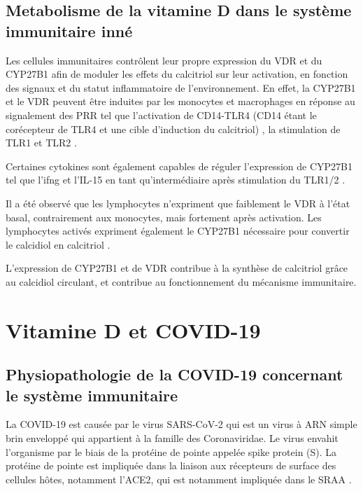 \documentclass[
  a4paper,
  DIV=11,
  numbers=noendperiod,
  listof=totoc]{scrreprt}
\begin{document}
\section{Metabolisme de la vitamine D dans le système immunitaire
inné}\label{metabolisme-de-la-vitamine-d-dans-le-systuxe8me-immunitaire-innuxe9}

Les cellules immunitaires contrôlent leur propre expression du \ac{VDR}
et du \ac{CYP27B1} afin de moduler les effets du calcitriol sur leur
activation, en fonction des signaux et du statut inflammatoire de
l'environnement. En effet, la \ac{CYP27B1} et le \ac{VDR} peuvent être
induites par les monocytes et macrophages en réponse au signalement des
\ac{PRR} tel que l'activation de CD14-TLR4 (CD14 étant le corécepteur de
TLR4 et une cible d'induction du calcitriol) \autocite{Stoffels.2009},
la stimulation de TLR1 et TLR2 \autocite{Liu.2006}.

Certaines cytokines sont également capables de réguler l'expression de
\ac{CYP27B1} tel que l'\ac{ifng} \autocite{Stoffels.2009} et l'IL-15 en
tant qu'intermédiaire après stimulation du TLR1/2
\autocite{Krutzik.2008}.

Il a été observé que les lymphocytes n'expriment que faiblement le
\ac{VDR} à l'état basal, contrairement aux monocytes, mais fortement
après activation. Les lymphocytes activés expriment également le
\ac{CYP27B1} nécessaire pour convertir le calcidiol en calcitriol
\autocite{Bishop.2021,Charoenngam.2020}.

L'expression de \ac{CYP27B1} et de \ac{VDR} contribue à la synthèse de
calcitriol grâce au calcidiol circulant, et contribue au fonctionnement
du mécanisme immunitaire.

\newpage{}

\chapter{Vitamine D et COVID-19}\label{vitamine-d-et-covid-19}

\section{Physiopathologie de la COVID-19 concernant le système
immunitaire}\label{physiopathologie-de-la-covid-19-concernant-le-systuxe8me-immunitaire}

La \ac{COVID-19} est causée par le virus \ac{SARS-CoV-2} qui est un
virus à ARN simple brin enveloppé qui appartient à la famille des
Coronaviridae. Le virus envahit l'organisme par le biais de la protéine
de pointe appelée spike protein (S). La protéine de pointe est impliquée
dans la liaison aux récepteurs de surface des cellules hôtes, notamment
l'\ac{ACE2}, qui est notamment impliquée dans le \ac{SRAA}
\autocite{Marik.2021}.
\end{document}
